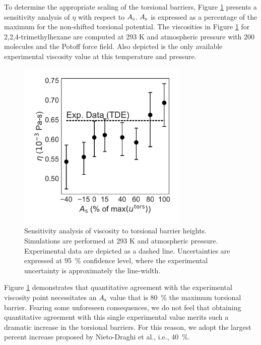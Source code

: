 \documentclass[preprint,review,11pt]{elsarticle}
\begin{document}
	To determine the appropriate scaling of the torsional barriers, Figure \ref{fig:sensitivity_torsions} presents a sensitivity analysis of $\eta$ with respect to $A_{\rm s}$. $A_{\rm s}$ is expressed as a percentage of the maximum for the non-shifted torsional potential. The viscosities in Figure \ref{fig:sensitivity_torsions} for 2,2,4-trimethylhexane are computed at 293 K and atmospheric pressure with 200 molecules and the Potoff force field. Also depicted is the only available experimental viscosity value at this temperature and pressure. 	 
	
	\begin{figure}[htb!]
		\centering
				\includegraphics[width=3.2in]{sensitivity_torsions.pdf}
		\caption{Sensitivity analysis of viscosity to torsional barrier heights. Simulations are performed at 293 K and atmospheric pressure. Experimental data are depicted as a dashed line. Uncertainties are expressed at 95~\% confidence level, where the experimental uncertainty is approximately the line-width.}
		\label{fig:sensitivity_torsions}
	\end{figure}
	
	
	Figure \ref{fig:sensitivity_torsions} demonstrates that quantitative agreement with the experimental viscosity point necessitates an $A_{\rm s}$ value that is 80~\% the maximum torsional barrier. Fearing some unforeseen consequences, we do not feel that obtaining quantitative agreement with this single experimental value merits such a dramatic increase in the torsional barriers. For this reason, we adopt the largest percent increase proposed by Nieto-Draghi et al., i.e., 40~\%. 
	
\end{document}
